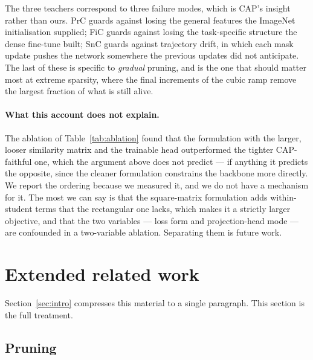 The three teachers correspond to three failure modes, which is CAP's insight
\citep{xu2022cap} rather than ours. PrC guards against losing the general
features the ImageNet initialisation supplied; FiC guards against losing the
task-specific structure the dense fine-tune built; SnC guards against trajectory
drift, in which each mask update pushes the network somewhere the previous
updates did not anticipate. The last of these is specific to \emph{gradual}
pruning, and is the one that should matter most at extreme sparsity, where the
final increments of the cubic ramp remove the largest fraction of what is still
alive.

\paragraph{What this account does not explain.}
The ablation of Table~\ref{tab:ablation} found that the formulation with the
larger, looser similarity matrix and the trainable head outperformed the tighter
CAP-faithful one, which the argument above does not predict --- if anything it
predicts the opposite, since the cleaner formulation constrains the backbone more
directly. We report the ordering because we measured it, and we do not have a
mechanism for it. The most we can say is that the square-matrix formulation adds
within-student terms that the rectangular one lacks, which makes it a strictly
larger objective, and that the two variables --- loss form and projection-head
mode --- are confounded in a two-variable ablation. Separating them is future
work.

\section{Extended related work}
\label{sec:app:related}

Section~\ref{sec:intro} compresses this material to a single paragraph. This
section is the full treatment.

\subsection{Pruning}

